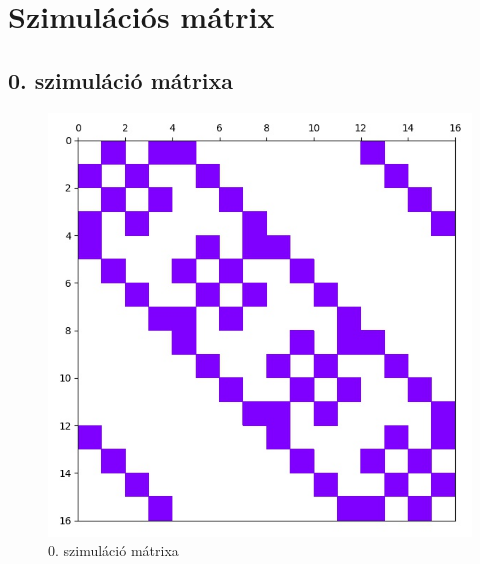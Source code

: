 \documentclass[14pt,a4paper]{article}
\begin{document}
\section{Szimulációs mátrix}
\subsection{0. szimuláció mátrixa}
\begin{figure}[H]
\centering
\includegraphics[width = 0.7\columnwidth]{sim_00/simulation_matrix.jpg}
\caption{0. szimuláció mátrixa}
\end{figure}
\end{document}
